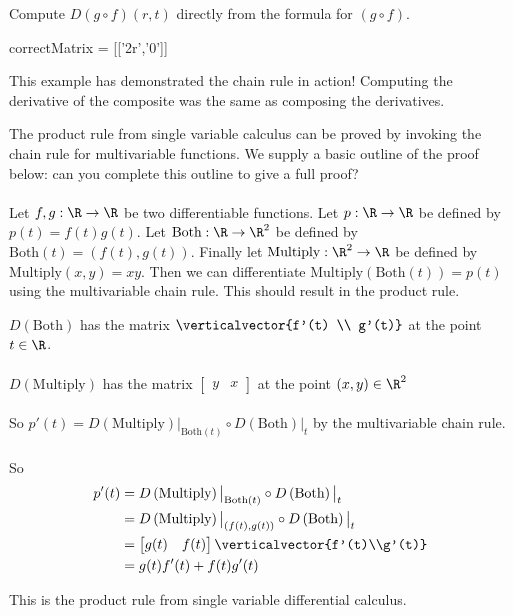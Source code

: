 \documentclass{ximera}
\begin{document}
\begin{question}
	\begin{solution}
		Compute $D(g \circ f)(r,t)$ directly from the formula for $(g \circ f)$.
		\begin{matrix-answer}
			correctMatrix = [['2r','0']]
		\end{matrix-answer}
	\end{solution}
	
	This example has demonstrated the chain rule in action!  Computing the derivative of the composite was the same as composing the derivatives.
\end{question}

The product rule from single variable calculus can be proved by invoking the chain rule for multivariable functions. We supply a basic outline of the proof below:
can you complete this outline to give a full proof?
\\
\\
Let $f,g:\R \to \R$ be two differentiable functions. Let $p:\R \to \R$ be defined by $p(t) = f(t)g(t)$. Let $\text{Both}:\R \to \R^2$ be defined by $\text{Both}(t) = (f(t),g(t))$.  
Finally let $\text{Multiply}:\R^2 \to \R$ be defined by $\text{Multiply}(x,y) = xy$.  Then we can differentiate $\text{Multiply}(\text{Both}(t)) = p(t)$ using the multivariable chain rule.
This should result in the product rule.

\begin{free-response}
	$D\left(\text{Both}\right)$ has the matrix $\verticalvector{f'(t) \\ g'(t)}$ at the point $t \in \R$.
	\\
	\\
	$D\left( \text{Multiply} \right)$ has the matrix \(\begin{bmatrix} y & x\end{bmatrix}\) at the point $(x,y)\in \R^2$
	\\
	\\
	So $p'(t) =  D\left( \text{Multiply} \right)\big|_{\text{Both}(t)}\circ D\left(\text{Both}\right)\big|_{t}$ by the multivariable chain rule.
	\\
	\\
	So
	\begin{align*}
		p'(t) &= D\left( \text{Multiply} \right)\big|_{\text{Both}(t)}\circ D\left(\text{Both}\right)\big|_{t}\\
			&= D\left( \text{Multiply} \right)\big|_{(f(t),g(t))}\circ D\left(\text{Both}\right)\big|_{t}\\
			&= \begin{bmatrix} g(t) & f(t)\end{bmatrix} \verticalvector{f'(t)\\g'(t)}\\
			&= g(t)f'(t)+f(t)g'(t)
	\end{align*}
	
	This is the product rule from single variable differential calculus.
\end{free-response}
\end{document}
